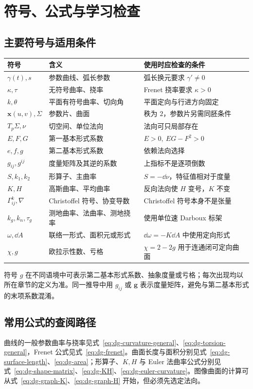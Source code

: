 \setcounter{chapter}{1} %
\chapter{符号、公式与学习检查}
\label{app:dg-reference}

\section{主要符号与适用条件}
\begin{longtable}{p{}p{}p{}}
\toprule
符号 & 含义 & 使用时应检查的条件\\
\midrule
\endhead
$\gamma(t),s$ & 参数曲线、弧长参数 & 弧长换元要求 $\gamma'\ne0$\\
$\kappa,\tau$ & 无符号曲率、挠率 & Frenet 挠率要求 $\kappa>0$\\
$k,\theta$ & 平面有符号曲率、切向角 & 平面定向与行进方向固定\\
$\mathbf x(u,v),\Sigma$ & 参数片、曲面 & 秩为 $2$，参数片另需同胚条件\\
$T_p\Sigma,\nu$ & 切空间、单位法向 & 法向可只局部存在\\
$E,F,G$ & 第一基本形式系数 & $E>0,\ EG-F^2>0$\\
$e,f,g$ & 第二基本形式系数 & 依赖法向选择\\
$g_{ij},g^{ij}$ & 度量矩阵及其逆的系数 & 上指标不是逐项倒数\\
$S,k_1,k_2$ & 形算子、主曲率 & $S=-\dd\nu$，特征值相对于度量\\
$K,H$ & 高斯曲率、平均曲率 & 反向法向使 $H$ 变号，$K$ 不变\\
$\Gamma^k_{ij},\nabla$ & Christoffel 符号、协变导数 & Christoffel 符号本身不是张量\\
$k_g,k_n,\tau_g$ & 测地曲率、法曲率、测地挠率 & 使用单位速 Darboux 标架\\
$\omega,\dd A$ & 联络一形式、面积元或形式 & $\dd\omega=-K\dd A$ 中使用定向形式\\
$\chi,g$ & 欧拉示性数、亏格 & $\chi=2-2g$ 用于连通闭可定向曲面\\
\bottomrule
\end{longtable}
符号 $g$ 在不同语境中可表示第二基本形式系数、抽象度量或亏格；每次出现均以所在章节的定义为准。同一推导中用 $g_{ij}$ 或 $\mathbf g$ 表示度量矩阵，避免与第二基本形式的末项系数混淆。

\section{常用公式的查阅路径}
曲线的一般参数曲率与挠率见式~\eqref{eq:dg-curvature-general}、\eqref{eq:dg-torsion-general}，Frenet 公式见式~\eqref{eq:dg-frenet}。曲面长度与面积分别见式~\eqref{eq:dg-surface-length}、\eqref{eq:dg-area}；形算子、$K,H$ 与 Euler 法曲率公式分别见式~\eqref{eq:dg-shape-matrix}、\eqref{eq:dg-KH}、\eqref{eq:dg-euler-curvature}。图像曲面的计算可从式~\eqref{eq:dg-graph-K}、\eqref{eq:dg-graph-H} 开始，但必须先选定法向。

